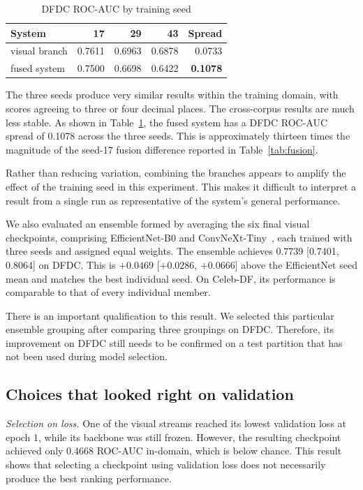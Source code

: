 \documentclass[conference]{IEEEtran}
\begin{document}
\begin{table}[htbp]
\caption{DFDC ROC-AUC by training seed}
\label{tab:seeds}
\centering
\begin{tabular}{lrrrr}
\toprule
System & 17 & 29 & 43 & Spread \\
\midrule
visual branch & 0.7611 & 0.6963 & 0.6878 & 0.0733 \\
fused system & 0.7500 & 0.6698 & 0.6422 & \textbf{0.1078} \\
\bottomrule
\end{tabular}
\end{table}

The three seeds produce very similar results within the training domain, with
scores agreeing to three or four decimal places. The cross-corpus results are
much less stable. As shown in Table~\ref{tab:seeds}, the fused system has a
DFDC ROC-AUC spread of 0.1078 across the three seeds. This is approximately
thirteen times the magnitude of the seed-17 fusion difference reported in
Table~\ref{tab:fusion}.

Rather than reducing variation, combining the branches appears to amplify
the effect of the training seed in this experiment. This makes it difficult
to interpret a result from a single run as representative of the system's
general performance.

We also evaluated an ensemble formed by averaging the six final visual
checkpoints, comprising EfficientNet-B0 and ConvNeXt-Tiny~\cite{convnext},
each trained with three seeds and assigned equal weights. The ensemble
achieves 0.7739 [0.7401, 0.8064] on DFDC. This is
$+0.0469$ [$+0.0286$, $+0.0666$] above the EfficientNet seed mean and
matches the best individual seed. On Celeb-DF, its performance is comparable
to that of every individual member.

There is an important qualification to this result. We selected this
particular ensemble grouping after comparing three groupings on DFDC.
Therefore, its improvement on DFDC still needs to be confirmed on a test
partition that has not been used during model selection.

\subsection{Choices that looked right on validation}

\textit{Selection on loss.}
One of the visual streams reached its lowest validation loss at epoch 1,
while its backbone was still frozen. However, the resulting checkpoint
achieved only 0.4668 ROC-AUC in-domain, which is below chance. This result
shows that selecting a checkpoint using validation loss does not necessarily
produce the best ranking performance.
\end{document}
